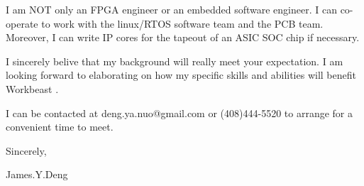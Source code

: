 { \bigbreak } 
I am NOT only an FPGA engineer or an embedded software engineer. 
I can co-operate to work with the linux/RTOS software team and the PCB team.
Moreover, I can write IP cores for the tapeout of an ASIC SOC chip if necessary.

{ \bigbreak } 
I sincerely belive that my background will really meet your expectation.
I am looking forward to elaborating on how my specific skills and abilities will benefit Workbeast .

{ \bigbreak } 
I can be contacted at deng.ya.nuo@gmail.com
or (408)444-5520 to arrange for a convenient time to meet.

{ \bigbreak } 




\vskip 60pt

{ \bigbreak } 
Sincerely,

James.Y.Deng

\bye
